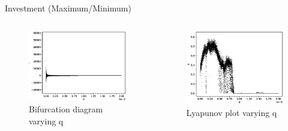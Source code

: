 \documentclass{beamer}
\begin{document}
\begin{frame}{Investment (Maximum/Minimum)}
	\begin{columns}
	\begin{column}{0.5\textwidth}
		\begin{figure}
			\centering
			\includegraphics[width=1.2\textwidth]{qbifurcation.eps}
			\caption{Bifurcation diagram varying q}
		\end{figure}
	\end{column}
	\begin{column}{0.5\textwidth}
		\begin{figure}
			\centering
			\includegraphics[width=1.2\textwidth]{qlyplot.eps}
			\caption{Lyapunov plot varying q}
		\end{figure}
	\end{column}
	\end{columns}
\end{frame}
\end{document}
